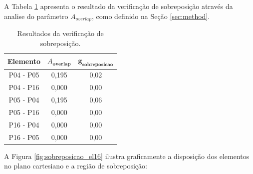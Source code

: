 A Tabela \ref{tab:sobreposicao_s16_g} apresenta o resultado da verificação de sobreposição através da analise do parâmetro $A_{overlap}$, como definido na Seção \ref{sec:method}.

\begin{table}[H]
\caption{Resultados da verificação de sobreposição.}
\label{tab:sobreposicao_s16_g}
\centering
\begin{tabular}{ccc}
\toprule
\textbf{Elemento} &
$A_{\textbf{overlap}}$ &
$\mathbf{g_{\mathbf{sobreposicao}}}$ \\
\midrule
P04 - P05 & 0,195 & 0,02 \\
P04 - P16 & 0,000 & 0,00 \\
P05 - P04 & 0,195 & 0,06 \\
P05 - P16 & 0,000 & 0,00\\
P16 - P04 & 0,000 & 0,00\\
P16 - P05 & 0,000 & 0,00 \\
\bottomrule
\end{tabular}
\end{table}


A Figura \ref{fig:sobreposicao_el16} ilustra graficamente a disposição dos elementos no plano cartesiano e a região de sobreposição:


